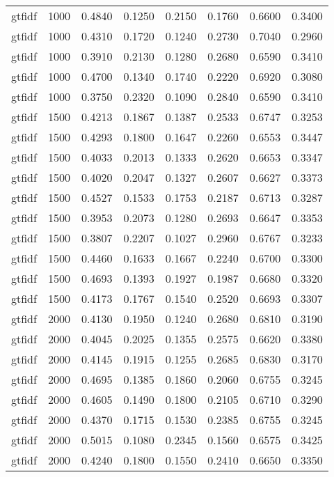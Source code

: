 \begin{scriptsize}
\begin{longtable}{cccccccc}
		gtfidf   & 1000 & 0.4840 & 0.1250 & 0.2150 & 0.1760 & 0.6600 & 0.3400 \\
		gtfidf   & 1000 & 0.4310 & 0.1720 & 0.1240 & 0.2730 & 0.7040 & 0.2960 \\
		gtfidf   & 1000 & 0.3910 & 0.2130 & 0.1280 & 0.2680 & 0.6590 & 0.3410 \\
		gtfidf   & 1000 & 0.4700 & 0.1340 & 0.1740 & 0.2220 & 0.6920 & 0.3080 \\
		gtfidf   & 1000 & 0.3750 & 0.2320 & 0.1090 & 0.2840 & 0.6590 & 0.3410 \\
		gtfidf   & 1500 & 0.4213 & 0.1867 & 0.1387 & 0.2533 & 0.6747 & 0.3253 \\
		gtfidf   & 1500 & 0.4293 & 0.1800 & 0.1647 & 0.2260 & 0.6553 & 0.3447 \\
		gtfidf   & 1500 & 0.4033 & 0.2013 & 0.1333 & 0.2620 & 0.6653 & 0.3347 \\
		gtfidf   & 1500 & 0.4020 & 0.2047 & 0.1327 & 0.2607 & 0.6627 & 0.3373 \\
		gtfidf   & 1500 & 0.4527 & 0.1533 & 0.1753 & 0.2187 & 0.6713 & 0.3287 \\
		gtfidf   & 1500 & 0.3953 & 0.2073 & 0.1280 & 0.2693 & 0.6647 & 0.3353 \\
		gtfidf   & 1500 & 0.3807 & 0.2207 & 0.1027 & 0.2960 & 0.6767 & 0.3233 \\
		gtfidf   & 1500 & 0.4460 & 0.1633 & 0.1667 & 0.2240 & 0.6700 & 0.3300 \\
		gtfidf   & 1500 & 0.4693 & 0.1393 & 0.1927 & 0.1987 & 0.6680 & 0.3320 \\
		gtfidf   & 1500 & 0.4173 & 0.1767 & 0.1540 & 0.2520 & 0.6693 & 0.3307 \\
		gtfidf   & 2000 & 0.4130 & 0.1950 & 0.1240 & 0.2680 & 0.6810 & 0.3190 \\
		gtfidf   & 2000 & 0.4045 & 0.2025 & 0.1355 & 0.2575 & 0.6620 & 0.3380 \\
		gtfidf   & 2000 & 0.4145 & 0.1915 & 0.1255 & 0.2685 & 0.6830 & 0.3170 \\
		gtfidf   & 2000 & 0.4695 & 0.1385 & 0.1860 & 0.2060 & 0.6755 & 0.3245 \\
		gtfidf   & 2000 & 0.4605 & 0.1490 & 0.1800 & 0.2105 & 0.6710 & 0.3290 \\
		gtfidf   & 2000 & 0.4370 & 0.1715 & 0.1530 & 0.2385 & 0.6755 & 0.3245 \\
		gtfidf   & 2000 & 0.5015 & 0.1080 & 0.2345 & 0.1560 & 0.6575 & 0.3425 \\
		gtfidf   & 2000 & 0.4240 & 0.1800 & 0.1550 & 0.2410 & 0.6650 & 0.3350 \\

\end{longtable}
\end{scriptsize}
